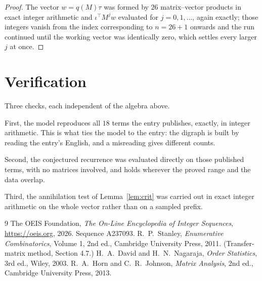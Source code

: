 \documentclass[11pt,a4paper]{article}
\theoremstyle{plain}
\theoremstyle{definition}
\begin{document}
\begin{proof}
The vector $w=q(M)\tau$ was formed by $26$ matrix--vector products in exact integer
arithmetic and $\iota^{\!\top}M^{j}w$ evaluated for $j=0,1,\dots$, again exactly; those
integers vanish from the index corresponding to $n=26+1$ onwards and the run continued
until the working vector was identically zero, which settles every larger $j$ at once.
\end{proof}

\section{Verification}

Three checks, each independent of the algebra above.

First, the model reproduces all $18$ terms the entry publishes, exactly, in integer
arithmetic. This is what ties the model to the entry: the digraph is built by reading the
entry's English, and a misreading gives different counts.

Second, the conjectured recurrence was evaluated directly on those published terms, with no
matrices involved, and holds wherever the proved range and the data overlap.

Third, the annihilation test of Lemma~\ref{lem:crit} was carried out in exact integer
arithmetic on the whole vector rather than on a sampled prefix.

\begin{thebibliography}{9}
 The OEIS Foundation, \emph{The On-Line Encyclopedia of Integer
Sequences}, \url{https://oeis.org}, 2026. Sequence A237093.
 R.~P.~Stanley, \emph{Enumerative Combinatorics}, Volume 1, 2nd ed.,
Cambridge University Press, 2011. (Transfer-matrix method, Section 4.7.)
 H.~A.~David and H.~N.~Nagaraja, \emph{Order Statistics}, 3rd ed., Wiley,
2003.
 R.~A.~Horn and C.~R.~Johnson, \emph{Matrix Analysis}, 2nd ed., Cambridge
University Press, 2013.
\end{thebibliography}
\end{document}
